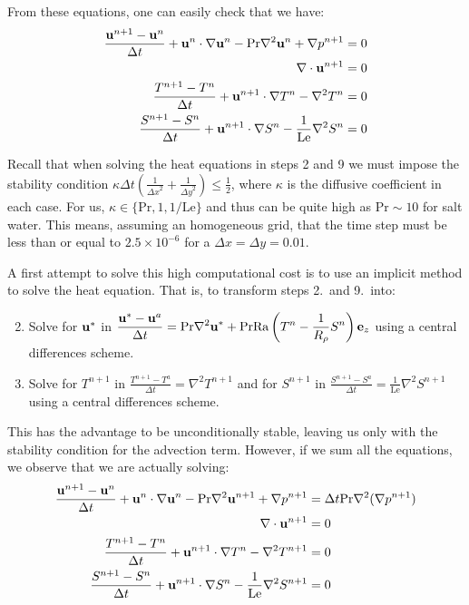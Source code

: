 \documentclass{article}
\def\Ra{\mathrm{Ra}}
\def\Pr{\mathrm{Pr}}
\def\Le{\mathrm{Le}}
\begin{document}
From these equations, one can easily check that we have:
\begin{align*}
  \frac{\vf{u}^{n+1}-\vf{u}^n}{\Delta t} + \vf{u}^n \cdot \nabla \vf{u}^n - \Pr \nabla^2 \vf{u}^n + \nabla p^{n+1} & = 0 \\
  \nabla \cdot \vf{u}^{n+1}                                                                                        & = 0 \\
  \frac{T^{n+1}-T^{n}}{\Delta t} + \vf{u}^{n+1} \cdot \nabla T^{n} - \nabla^2 T^{n}                                & = 0 \\
  \frac{S^{n+1}-S^{n}}{\Delta t} + \vf{u}^{n+1} \cdot \nabla S^{n} - \frac{1}{\Le}\nabla^2 S^{n}                   & = 0
\end{align*}

Recall that when solving the heat equations in steps 2 and 9 we must impose the stability condition $\kappa \Delta t\left( \frac{1}{{\Delta x}^2} + \frac{1}{{\Delta y}^2}\right) \leq \frac{1}{2}$, where $\kappa$ is the diffusive coefficient in each case. For us, $\kappa \in \{\Pr, 1, 1/\Le\}$ and thus can be quite high as $\Pr\sim 10$ for salt water. This means, assuming an homogeneous grid, that the time step must be less than or equal to $2.5\times 10^{-6}$ for a $\Delta x = \Delta y = 0.01$.

A first attempt to solve this high computational cost is to use an implicit method to solve the heat equation. That is, to transform steps 2.\ and 9.\ into:
\begin{enumerate}
  \setcounter{enumi}{1}
  \item Solve for $\boldsymbol{\mathrm{u}}^*$ in $\displaystyle  \frac{\vf{u}^* - \vf{u}^a}{\Delta t} = \Pr \nabla^2 \vf{u}^* +\Pr\Ra\left(T^n - \frac{1}{R_{\rho}}S^n\right)\vf{e}_z$ using a central differences scheme.
        \setcounter{enumi}{8}
  \item Solve for $T^{n+1}$ in $\displaystyle  \frac{T^{n+1}-T^{a}}{\Delta t} = \nabla^2 T^{n+1}$ and for $S^{n+1}$ in $\displaystyle  \frac{S^{n+1}-S^{a}}{\Delta t} = \frac{1}{\Le}\nabla^2 S^{n+1}$ using a central differences scheme.
\end{enumerate}

This has the advantage to be unconditionally stable, leaving us only with the stability condition for the advection term. However, if we sum all the equations, we observe that we are actually solving:
\begin{align*}
  \frac{\vf{u}^{n+1}-\vf{u}^n}{\Delta t} + \vf{u}^n \cdot \nabla \vf{u}^n - \Pr \nabla^2 \vf{u}^{n+1} + \nabla p^{n+1} & = \Delta t \Pr \nabla^2(\nabla p^{n+1}) \\
  \nabla \cdot \vf{u}^{n+1}                                                                                            & = 0                                     \\
  \frac{T^{n+1}-T^{n}}{\Delta t} + \vf{u}^{n+1} \cdot \nabla T^{n} - \nabla^2 T^{n+1}                                  & = 0                                     \\
  \frac{S^{n+1}-S^{n}}{\Delta t} + \vf{u}^{n+1} \cdot \nabla S^{n} - \frac{1}{\Le}\nabla^2 S^{n+1}                     & = 0
\end{align*}
\end{document}
